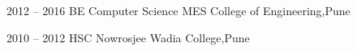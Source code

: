 \documentclass[9pt]{developercv} %
\begin{document}


\begin{entrylist}
	\entry
		{2012 -- 2016}
		{BE Computer Science}
		{MES College of Engineering,Pune}
		
	\entry
		{2010 -- 2012}
		{HSC}
		{Nowrosjee Wadia College,Pune}
		
\end{entrylist}




\end{document}
